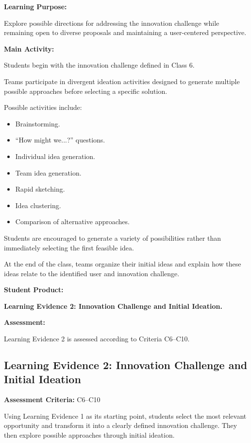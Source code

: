 \documentclass[12pt,a4paper]{article}
\begin{document}
	\textbf{Learning Purpose:}
	
	Explore possible directions for addressing the innovation challenge while remaining open to diverse proposals and maintaining a user-centered perspective.
	
	\textbf{Main Activity:}
	
	Students begin with the innovation challenge defined in Class 6.
	
	Teams participate in divergent ideation activities designed to generate multiple possible approaches before selecting a specific solution.
	
	Possible activities include:
	
	\begin{itemize}
		\item Brainstorming.
		\item ``How might we...?'' questions.
		\item Individual idea generation.
		\item Team idea generation.
		\item Rapid sketching.
		\item Idea clustering.
		\item Comparison of alternative approaches.
	\end{itemize}
	
	Students are encouraged to generate a variety of possibilities rather than immediately selecting the first feasible idea.
	
	At the end of the class, teams organize their initial ideas and explain how these ideas relate to the identified user and innovation challenge.
	
	\textbf{Student Product:}
	
	\textbf{Learning Evidence 2: Innovation Challenge and Initial Ideation.}
	
	\textbf{Assessment:}
	
	Learning Evidence 2 is assessed according to Criteria C6--C10.
	
	
	\subsection{Learning Evidence 2: Innovation Challenge and Initial Ideation}
	
	\textbf{Assessment Criteria:} C6--C10
	
	Using Learning Evidence 1 as its starting point, students select the most relevant opportunity and transform it into a clearly defined innovation challenge. They then explore possible approaches through initial ideation.
	
\end{document}
